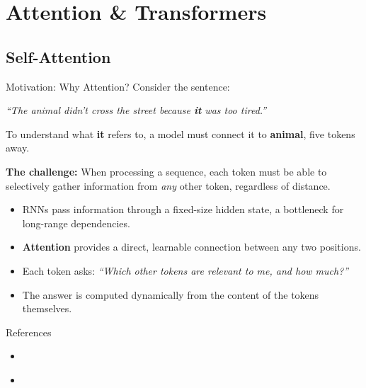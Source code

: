 
\section{Attention \& Transformers}

\subsection{Self-Attention}

\begin{frame}{Motivation: Why Attention?}
  Consider the sentence:
  \begin{center}
    \textit{``The animal didn't cross the street because \textbf{it} was too tired.''}
  \end{center}

  To understand what \textbf{it} refers to, a model must connect it to \textbf{animal}, five tokens away.

  \vspace{0.5em}
  \textbf{The challenge:} When processing a sequence, each token must be able to selectively gather
  information from \emph{any} other token, regardless of distance.

  \begin{itemize}
    \item RNNs pass information through a fixed-size hidden state, a bottleneck for long-range dependencies.
    \item \textbf{Attention} provides a direct, learnable connection between any two positions.
    \item Each token asks: \emph{``Which other tokens are relevant to me, and how much?''}
    \item The answer is computed dynamically from the content of the tokens themselves.
  \end{itemize}

  \vspace{0.3em}
  \begin{block}{References}
    \begin{itemize}
      \item \cite{vaswani2017attention}
      \item \cite{alammar2018illustrated}
    \end{itemize}
  \end{block}
\end{frame}

